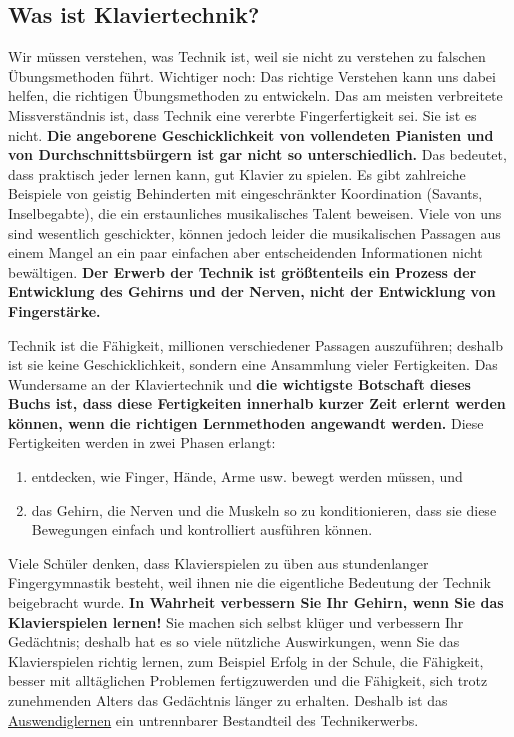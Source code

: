 \subsection{Was ist Klaviertechnik?}
\label{c1i2}

Wir müssen verstehen, was Technik ist, weil sie nicht zu verstehen zu falschen Übungsmethoden führt.
Wichtiger noch: Das richtige Verstehen kann uns dabei helfen, die richtigen Übungsmethoden zu entwickeln.
Das am meisten verbreitete Missverständnis ist, dass Technik eine vererbte Fingerfertigkeit sei.
Sie ist es nicht.
\textbf{Die angeborene Geschicklichkeit von vollendeten Pianisten und von Durchschnittsbürgern ist gar nicht so unterschiedlich.}
Das bedeutet, dass praktisch jeder lernen kann, gut Klavier zu spielen.
Es gibt zahlreiche Beispiele von geistig Behinderten mit eingeschränkter Koordination (Savants, Inselbegabte), die ein erstaunliches musikalisches Talent beweisen.
Viele von uns sind wesentlich geschickter, können jedoch leider die musikalischen Passagen aus einem Mangel an ein paar einfachen aber entscheidenden Informationen nicht bewältigen.
\textbf{Der Erwerb der Technik ist größtenteils ein Prozess der Entwicklung des Gehirns und der Nerven, nicht der Entwicklung von Fingerstärke.}

Technik ist die Fähigkeit, millionen verschiedener Passagen auszuführen; deshalb ist sie keine Geschicklichkeit, sondern eine Ansammlung vieler Fertigkeiten.
Das Wundersame an der Klaviertechnik und \textbf{die wichtigste Botschaft dieses Buchs ist, dass diese Fertigkeiten innerhalb kurzer Zeit erlernt werden können, wenn die richtigen Lernmethoden angewandt werden.}
Diese Fertigkeiten werden in zwei Phasen erlangt:

\begin{enumerate}[label={\arabic*.}] 
\item entdecken, wie Finger, Hände, Arme usw. bewegt werden müssen, und
\item das Gehirn, die Nerven und die Muskeln so zu konditionieren, dass sie diese Bewegungen einfach und kontrolliert ausführen können.
 \end{enumerate}
Viele Schüler denken, dass Klavierspielen zu üben aus stundenlanger Fingergymnastik besteht, weil ihnen nie die eigentliche Bedeutung der Technik beigebracht wurde.
\textbf{In Wahrheit verbessern Sie Ihr Gehirn, wenn Sie das Klavierspielen lernen!}
Sie machen sich selbst klüger und verbessern Ihr Gedächtnis; deshalb hat es so viele nützliche Auswirkungen, wenn Sie das Klavierspielen richtig lernen, zum Beispiel Erfolg in der Schule, die Fähigkeit, besser mit alltäglichen Problemen fertigzuwerden und die Fähigkeit, sich trotz zunehmenden Alters das Gedächtnis länger zu erhalten.
Deshalb ist das \hyperref[c1iii6]{Auswendiglernen} ein untrennbarer Bestandteil des Technikerwerbs.

